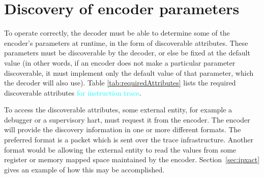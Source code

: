\section {Discovery of encoder parameters} \label{sec:disco}

To operate correctly, the decoder must be able to determine some of the encoder's parameters 
at runtime, in the form of discoverable attributes.  These parameters must be discoverable by the 
decoder, or else be fixed at the default value (in other words, if an encoder does not make a 
particular parameter discoverable, it must implement only the default value of that parameter, 
which the decoder will also use).  Table \ref{tab:requiredAttributes} lists the required 
discoverable attributes \textcolor{cyan}{for instruction trace}.

To access the discoverable attributes, some external entity, for example a debugger or a 
supervisory hart, must request it from the encoder. The encoder will
provide the discovery information in one or more different formats.  
The preferred format is a packet which is sent over the trace infrastructure.
Another format would be allowing the external entity to read the
values from some register or memory mapped space maintained by the encoder.
Section~\ref{sec:ipxact} gives an example of how this may be accomplished.

